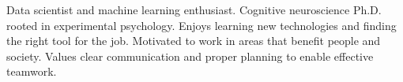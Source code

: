 
\begin{cvparagraph}

Data scientist and machine learning enthusiast. Cognitive neuroscience Ph.D. rooted in experimental psychology. Enjoys learning new technologies and finding the right tool for the job. Motivated to work in areas that benefit people and society. Values clear communication and proper planning to enable effective teamwork.

\end{cvparagraph}
